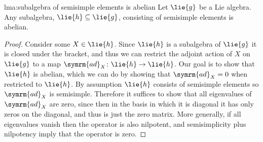 \documentclass[fleqn]{NotesClass}
\newcommand{\ad}{\symrm{ad}}
\begin{document}
    \begin{lma}{}{lma:subalgebra of semisimple elements is abelian}
        Let \(\lie{g}\) be a Lie algebra.
        Any subalgebra, \(\lie{h} \subseteq \lie{g}\), consisting of semisimple elements is abelian.
        \begin{proof}
            Consider some \(X \in \lie{h}\).
            Since \(\lie{h}\) is a subalgebra of \(\lie{g}\) it is closed under the bracket, and thus we can restrict the adjoint action of \(X\) on \(\lie{g}\) to a map \(\ad_X \colon \lie{h} \to \lie{h}\).
            Our goal is to show that \(\lie{h}\) is abelian, which we can do by showing that \(\ad_X = 0\) when restricted to \(\lie{h}\).
            By assumption \(\lie{h}\) consists of semisimple elements so \(\ad_X\) is semisimple.
            Therefore it suffices to show that all eigenvalues of \(\ad_X\) are zero, since then in the basis in which it is diagonal it has only zeros on the diagonal, and thus is just the zero matrix.
            More generally, if all eigenvalues vanish then the operator is also nilpotent, and semisimplicity plus nilpotency imply that the operator is zero.
            

\end{proof}
\end{lma}
\end{document}
